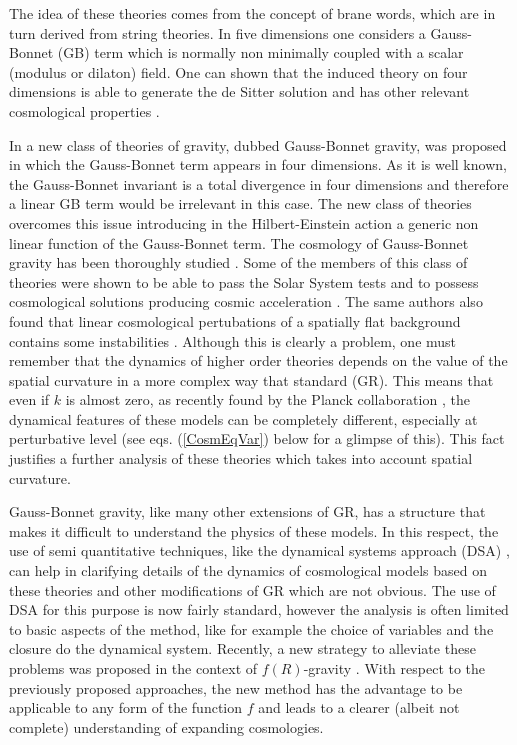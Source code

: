 \documentclass[a4paper,aps,onecolumn,nofootinbib]{revtex4}
\def\rf#1{(\ref{#1})}
\begin{document}
The idea of these theories comes from  the concept of brane words, which are in turn derived from string theories. In five dimensions one considers a Gauss-Bonnet (GB) term which is normally non minimally coupled with a scalar (modulus or dilaton) field. One can shown that the induced theory on four dimensions is able  to generate the de Sitter solution %
and has  other relevant cosmological properties \cite{Calcagni:2006ye,Deruelle}. 

In \cite{Od} a new class of theories of gravity, dubbed Gauss-Bonnet gravity, was proposed in which the Gauss-Bonnet term appears in four dimensions. As it is well known, the Gauss-Bonnet invariant is a total divergence in four dimensions and therefore a linear GB term would be irrelevant in this case. The new class of theories  overcomes this issue  introducing in the Hilbert-Einstein action a generic non linear function of the Gauss-Bonnet term. The cosmology of Gauss-Bonnet gravity has been thoroughly studied \cite{Cognola:2006eg,Nojiri:2007te,Bamba:2014mya,Garcia:2010xz}. Some of the members of this class of theories were shown to be able to pass the Solar System tests %
and to possess cosmological solutions %
 producing cosmic acceleration \cite{DeFelice:2008wz,DeFelice:2009aj,Davis:2007id}. The same authors also found that linear cosmological pertubations %
 of a spatially flat background  contains some instabilities \cite{DeFelice:2009rw}. Although this is clearly a problem, one must remember that %
the dynamics of higher order theories
depends on the value of the spatial curvature in a more complex way that standard (GR). This means that even if $k$ is almost zero, as recently found by  the Planck collaboration \cite{Ade:2015xua}, the dynamical features of these models can be completely different, especially at perturbative level (see eqs. \rf{CosmEqVar} below for a glimpse of this).  This fact justifies a further analysis of these theories which takes %
into account spatial curvature.

Gauss-Bonnet gravity, like many other extensions of GR, has a structure that makes it difficult to understand the physics of these models. In this respect, the use of semi quantitative techniques, like the dynamical systems approach (DSA) \cite{DSA}, can help in %
{ clarifying} details of the dynamics of cosmological models based on these theories  and other modifications of GR \cite{ModGravDSA} which are not obvious. The use of DSA for this purpose is now fairly standard, however the analysis is often limited to basic aspects of the method, like for example the choice of variables and the closure do the dynamical system. Recently, a new strategy to alleviate these  problems was proposed in the context of $f(R)$-gravity \cite{Carloni:2015jla}.  With respect to the previously proposed approaches, the new method has the advantage to be applicable to any form of the function $f$ and leads to a clearer (albeit not complete)  understanding of expanding cosmologies. 
\end{document}
